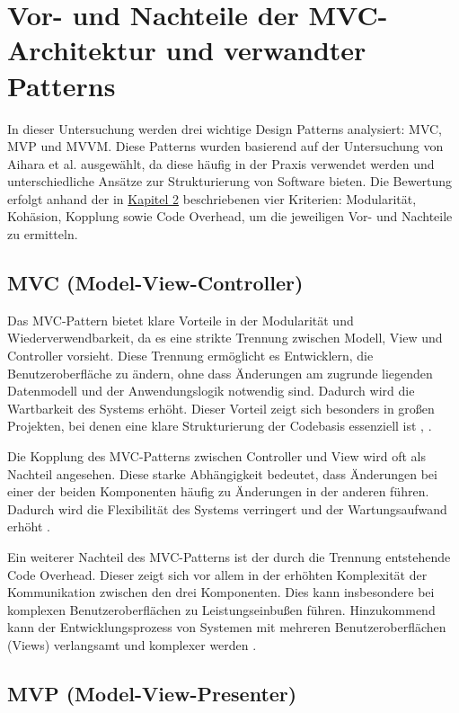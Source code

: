 \chapter{Vor- und Nachteile der MVC-Architektur und verwandter Patterns}

In dieser Untersuchung werden drei wichtige Design Patterns analysiert: \ac{MVC}, \ac{MVP} und \ac{MVVM}. Diese Patterns wurden basierend auf der Untersuchung von Aihara et al. \cite{aihara2012mvc} ausgewählt, da diese häufig in der Praxis verwendet werden und unterschiedliche Ansätze zur Strukturierung von Software bieten. Die Bewertung erfolgt anhand der in \hyperref[chap:methodik]{Kapitel 2} beschriebenen vier Kriterien: Modularität, Kohäsion, Kopplung sowie Code Overhead, um die jeweiligen Vor- und Nachteile zu ermitteln.

\section{MVC (Model-View-Controller)}

Das \ac{MVC}-Pattern bietet klare Vorteile in der Modularität und 
Wiederverwendbarkeit, da es eine strikte Trennung zwischen 
Modell, View und Controller vorsieht. Diese Trennung ermöglicht 
es Entwicklern, die Benutzeroberfläche zu ändern, ohne dass 
Änderungen am zugrunde liegenden Datenmodell und der Anwendungslogik notwendig sind. Dadurch wird die Wartbarkeit des Systems erhöht. Dieser Vorteil zeigt sich besonders in großen Projekten, bei denen eine klare Strukturierung der Codebasis essenziell ist \cite{eudl63}, 
\cite{researchgate65}.

Die Kopplung des \ac{MVC}-Patterns zwischen Controller und View wird oft als Nachteil angesehen. Diese starke Abhängigkeit bedeutet, dass Änderungen bei einer der beiden Komponenten häufig zu Änderungen in der anderen führen. Dadurch wird die Flexibilität des Systems verringert und der Wartungsaufwand erhöht \cite{researchgate65}.

Ein weiterer Nachteil des \ac{MVC}-Patterns ist der durch die Trennung entstehende Code Overhead. Dieser zeigt sich vor allem in der erhöhten Komplexität der Kommunikation zwischen den drei 
Komponenten. Dies kann insbesondere bei komplexen Benutzeroberflächen zu Leistungseinbußen führen. Hinzukommend kann der Entwicklungsprozess von Systemen mit mehreren Benutzeroberflächen (Views) verlangsamt und komplexer werden \cite{eudl63}.

\section{MVP (Model-View-Presenter)}

